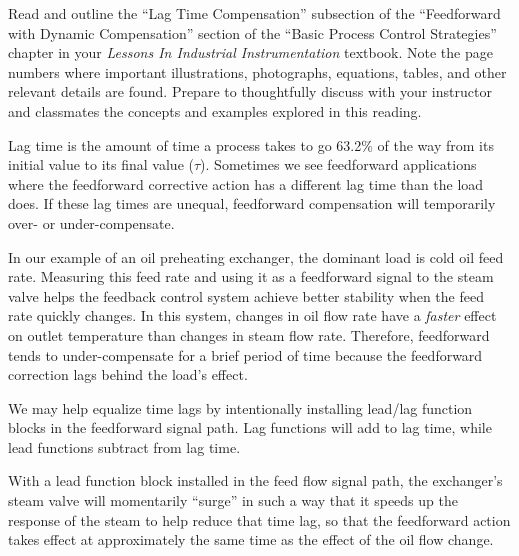 

Read and outline the ``Lag Time Compensation'' subsection of the ``Feedforward with Dynamic Compensation'' section of the ``Basic Process Control Strategies'' chapter in your {\it Lessons In Industrial Instrumentation} textbook.  Note the page numbers where important illustrations, photographs, equations, tables, and other relevant details are found.  Prepare to thoughtfully discuss with your instructor and classmates the concepts and examples explored in this reading.














Lag time is the amount of time a process takes to go 63.2\% of the way from its initial value to its final value ($\tau$).  Sometimes we see feedforward applications where the feedforward corrective action has a different lag time than the load does.  If these lag times are unequal, feedforward compensation will temporarily over- or under-compensate.

\vskip 10pt

In our example of an oil preheating exchanger, the dominant load is cold oil feed rate.  Measuring this feed rate and using it as a feedforward signal to the steam valve helps the feedback control system achieve better stability when the feed rate quickly changes.  In this system, changes in oil flow rate have a {\it faster} effect on outlet temperature than changes in steam flow rate.  Therefore, feedforward tends to under-compensate for a brief period of time because the feedforward correction lags behind the load's effect.

\vskip 10pt

We may help equalize time lags by intentionally installing lead/lag function blocks in the feedforward signal path.  Lag functions will add to lag time, while lead functions subtract from lag time.

\vskip 10pt

With a lead function block installed in the feed flow signal path, the exchanger's steam valve will momentarily ``surge'' in such a way that it speeds up the response of the steam to help reduce that time lag, so that the feedforward action takes effect at approximately the same time as the effect of the oil flow change.









